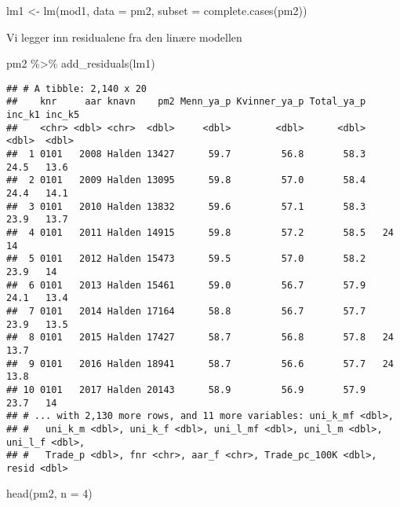 \documentclass[
]{article}
\newenvironment{Shaded}{\begin{snugshade}}{\end{snugshade}}
\newcommand{\AttributeTok}[1]{\textcolor[rgb]{0.77,0.63,0.00}{#1}}
\newcommand{\DecValTok}[1]{\textcolor[rgb]{0.00,0.00,0.81}{#1}}
\newcommand{\FunctionTok}[1]{\textcolor[rgb]{0.00,0.00,0.00}{#1}}
\newcommand{\NormalTok}[1]{#1}
\newcommand{\OtherTok}[1]{\textcolor[rgb]{0.56,0.35,0.01}{#1}}
\newcommand{\SpecialCharTok}[1]{\textcolor[rgb]{0.00,0.00,0.00}{#1}}
\begin{document}
\begin{Shaded}
\begin{Highlighting}[]
\NormalTok{lm1 }\OtherTok{\textless{}{-}} \FunctionTok{lm}\NormalTok{(mod1, }\AttributeTok{data =}\NormalTok{ pm2, }\AttributeTok{subset =} \FunctionTok{complete.cases}\NormalTok{(pm2))}
\end{Highlighting}
\end{Shaded}

Vi legger inn residualene fra den linære modellen

\begin{Shaded}
\begin{Highlighting}[]
\NormalTok{pm2 }\SpecialCharTok{\%\textgreater{}\%} 
\FunctionTok{add\_residuals}\NormalTok{(lm1)}
\end{Highlighting}
\end{Shaded}

\begin{verbatim}
## # A tibble: 2,140 x 20
##    knr     aar knavn    pm2 Menn_ya_p Kvinner_ya_p Total_ya_p inc_k1 inc_k5
##    <chr> <dbl> <chr>  <dbl>     <dbl>        <dbl>      <dbl>  <dbl>  <dbl>
##  1 0101   2008 Halden 13427      59.7         56.8       58.3   24.5   13.6
##  2 0101   2009 Halden 13095      59.8         57.0       58.4   24.4   14.1
##  3 0101   2010 Halden 13832      59.6         57.1       58.3   23.9   13.7
##  4 0101   2011 Halden 14915      59.8         57.2       58.5   24     14  
##  5 0101   2012 Halden 15473      59.5         57.0       58.2   23.9   14  
##  6 0101   2013 Halden 15461      59.0         56.7       57.9   24.1   13.4
##  7 0101   2014 Halden 17164      58.8         56.7       57.7   23.9   13.5
##  8 0101   2015 Halden 17427      58.7         56.8       57.8   24     13.7
##  9 0101   2016 Halden 18941      58.7         56.6       57.7   24     13.8
## 10 0101   2017 Halden 20143      58.9         56.9       57.9   23.7   14  
## # ... with 2,130 more rows, and 11 more variables: uni_k_mf <dbl>,
## #   uni_k_m <dbl>, uni_k_f <dbl>, uni_l_mf <dbl>, uni_l_m <dbl>, uni_l_f <dbl>,
## #   Trade_p <dbl>, fnr <chr>, aar_f <chr>, Trade_pc_100K <dbl>, resid <dbl>
\end{verbatim}

\begin{Shaded}
\begin{Highlighting}[]
\FunctionTok{head}\NormalTok{(pm2, }\AttributeTok{n =} \DecValTok{4}\NormalTok{)}
\end{Highlighting}
\end{Shaded}
\end{document}
